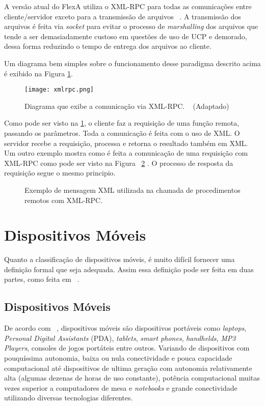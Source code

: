     A versão atual do FlexA utiliza o XML-RPC para todas as comunicações entre cliente/servidor exceto para a transmissão de arquivos ~\cite{mario}. A transmissão dos arquivos é feita via \textit{socket} para evitar o processo de \textit{marshalling} dos arquivos que tende a ser demasiadamente custoso em questões de uso de UCP e demorado, dessa forma reduzindo o tempo de entrega dos arquivos ao cliente.
    
    Um diagrama bem simples sobre o funcionamento desse paradigma descrito acima é exibido na Figura \ref{fig:xmlrpc}.
    
    \begin{figure}[!ht]
    \centering
    \texttt{[image: xmlrpc.png]}
    \caption{Diagrama que exibe a comunicação via XML-RPC. ~\cite{xmlrpc} (Adaptado)}
    \label{fig:xmlrpc}
    \end{figure}
    
    Como pode ser visto na \ref{fig:xmlrpc}, o cliente faz a requisição de uma função remota, passando os parâmetros. Toda a comunicação é feita com o uso de XML. O servidor recebe a requisição, processa e retorna o resultado também em XML. Um outro exemplo mostra como é feita a comunicação de uma requisição com XML-RPC como pode ser visto na Figura ~\ref{fig:xmlrpcMessage} . O processo de resposta da requisição segue o mesmo principio.
    
    \begin{figure}[!ht]
    \centering
    \caption{Exemplo de mensagem XML utilizada na chamada de procedimentos remotos com XML-RPC.}
    \label{fig:xmlrpcMessage}
    \end{figure}


\section{Dispositivos Móveis}

    Quanto a classificação de dispositivos móveis, é muito difícil fornecer uma definição formal que seja adequada. Assim essa definição pode ser feita em duas partes, como feita em ~\cite{mobileDevices}.
    
    \subsection{Dispositivos Móveis}
    De acordo com ~\cite{mobileDevices}, dispositivos móveis são dispositivos portáveis como    \textit{laptops}, \textit{Personal Digital Assistants} (PDA), \textit{tablets}, \textit{smart phones}, \textit{handhelds}, \textit{MP3 Players}, consoles de jogos portáteis entre outros. Variando de dispositivos com pouquíssima autonomia, baixa ou nula conectividade e pouca capacidade computacional até dispositivos de ultima geração com autonomia relativamente alta (algumas dezenas de horas de uso constante), potência computacional muitas vezes superior a computadores de mesa e \textit{notebooks} e grande conectividade utilizando diversas tecnologias diferentes. 
    
